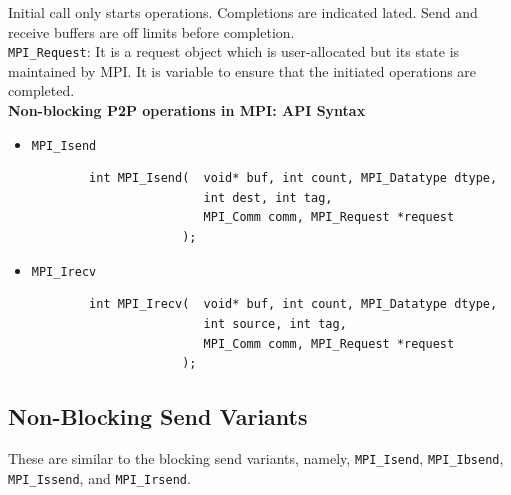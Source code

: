 \documentclass[12pt, a4paper]{report}
\begin{document}
Initial call only starts operations. Completions are indicated lated. Send and receive buffers are off limits before completion.\\[-1em]

\verb$MPI_Request$: It is a request object which is user-allocated but its state is maintained by MPI. It is variable to ensure that the initiated operations
are completed.\\

{\bfseries{Non-blocking P2P operations in MPI: API Syntax}}
\begin{itemize}
    \item \verb$MPI_Isend$
    \begin{verbatim}
        int MPI_Isend(  void* buf, int count, MPI_Datatype dtype,
                        int dest, int tag,
                        MPI_Comm comm, MPI_Request *request
                     );
    \end{verbatim}
    \item \verb$MPI_Irecv$
    \begin{verbatim}
        int MPI_Irecv(  void* buf, int count, MPI_Datatype dtype, 
                        int source, int tag,
                        MPI_Comm comm, MPI_Request *request
                     );
    \end{verbatim}
\end{itemize}

\subsection{Non-Blocking Send Variants}
These are similar to the blocking send variants, namely, \verb$MPI_Isend$, \verb$MPI_Ibsend$, \verb$MPI_Issend$, and \verb$MPI_Irsend$.
\end{document}
